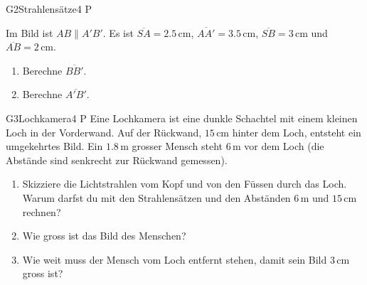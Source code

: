 \documentclass[11pt]{article}
\begin{document}
\begin{lpaufgabe}{G2}{Strahlensätze}{4 P}
\begin{minipage}[t]{0.52\linewidth}\vspace{0pt}
Im Bild ist $AB \parallel A'B'$. Es ist $\overline{SA} = 2.5\,\text{cm}$, $\overline{AA'} = 3.5\,\text{cm}$,
$\overline{SB} = 3\,\text{cm}$ und $\overline{AB} = 2\,\text{cm}$.
\begin{enumerate}[label=(\alph*),leftmargin=*,itemsep=2pt]
\item Berechne $\overline{BB'}$.
\item Berechne $\overline{A'B'}$.
\end{enumerate}
\end{minipage}\hfill
\begin{minipage}[t]{0.44\linewidth}\vspace{0pt}\centering
{}
\end{minipage}
\end{lpaufgabe}

\begin{lpaufgabe}{G3}{Lochkamera}{4 P}
Eine Lochkamera ist eine dunkle Schachtel mit einem kleinen Loch in der Vorderwand. Auf der Rückwand, $15\,\text{cm}$ hinter
dem Loch, entsteht ein umgekehrtes Bild. Ein $1.8\,\text{m}$ grosser Mensch steht $6\,\text{m}$ vor dem Loch (die Abstände
sind senkrecht zur Rückwand gemessen).
\begin{enumerate}[label=(\alph*),leftmargin=*,itemsep=2pt]
\item Skizziere die Lichtstrahlen vom Kopf und von den Füssen durch das Loch. Warum darfst du mit den Strahlensätzen und
  den Abständen $6\,\text{m}$ und $15\,\text{cm}$ rechnen?
\item Wie gross ist das Bild des Menschen?
\item Wie weit muss der Mensch vom Loch entfernt stehen, damit sein Bild $3\,\text{cm}$ gross ist?
\end{enumerate}
\end{lpaufgabe}
\end{document}
